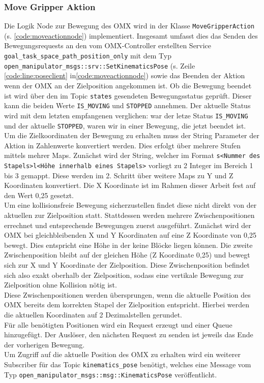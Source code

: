 \subsubsection{Move Gripper Aktion}
Die Logik Node zur Bewegung des OMX wird in der Klasse \verb|MoveGripperAction| (s. \ref{code:moveactionnode}) implementiert. Insgesamt umfasst dies das Senden des Bewegungsrequests an den vom OMX-Controller erstellten Service \verb|goal_task_space_path_position_only| mit dem Typ \verb|open_manipulator_msgs::srv::SetKinematicsPose| (s. Zeile \ref{code:line:poseclient} in\ref{code:moveactionnode}) sowie das Beenden der Aktion wenn der OMX an der Zielposition angekommen ist. Ob die Bewegung beendet ist wird über den im Topic \verb|states| gesendeten Bewegungsstatus geprüft. Dieser kann die beiden Werte \verb|IS_MOVING| und \verb|STOPPED| annehmen. Der aktuelle Status wird mit dem letzten empfangenen verglichen: war der letze Status \verb|IS_MOVING| und der aktuelle \verb|STOPPED|, waren wir in einer Bewegung, die jetzt beendet ist.\\
Um die Zielkoordinaten der Bewegung zu erhalten muss der String Parameter der Aktion in Zahlenwerte konvertiert werden. Dies erfolgt über mehrere Stufen mittels mehrer Maps. Zunächst wird der String, welcher im Format \verb|s<Nummer des Stapels>l<Höhe innerhalb eines Stapels>| vorliegt zu 2 Integer im Bereich 1 bis 3 gemappt. Diese werden im 2. Schritt über weitere Maps zu Y und Z Koordinaten konvertiert. Die X Koordinate ist im Rahmen dieser Arbeit fest auf den Wert 0,25 gesetzt.\\
Um eine kollisionsfreie Bewegung sicherzustellen findet diese nicht direkt von der aktuellen zur Zielposition statt. Stattdessen werden mehrere Zwischenpositionen errechnet und entsprechende Bewegungen zuerst ausgeführt. Zunächst wird der OMX bei gleichbleibenden X und Y Koordinaten auf eine Z Koordinate von 0,25 bewegt. Dies entspricht eine Höhe in der keine Blöcke liegen können. Die zweite Zwischenposition bleibt auf der gleichen Höhe (Z Koordinate 0,25) und bewegt sich zur X und Y Koordinate der Zielposition. Diese Zwischenposition befindet sich also exakt oberhalb der Zielposition, sodass eine vertikale Bewegung zur Zielposition ohne Kollision nötig ist.\\
Diese Zwischenpositionen werden übersprungen, wenn die aktuelle Position des OMX bereits dem korrekten Stapel der Zielposition entspricht. Hierbei werden die aktuellen Koordinaten auf 2 Dezimalstellen gerundet.\\
Für alle benötigten Positionen wird ein Request erzeugt und einer Queue hinzugefügt. Der Auslöser, den nächsten Request zu senden ist jeweils das Ende der vorherigen Bewegung.\\
Um Zugriff auf die aktuelle Position des OMX zu erhalten wird ein weiterer Subscriber für das Topic \verb|kinematics_pose| benötigt, welches eine Message vom Typ \verb|open_manipulator_msgs::msg::KinematicsPose| veröffentlicht.


